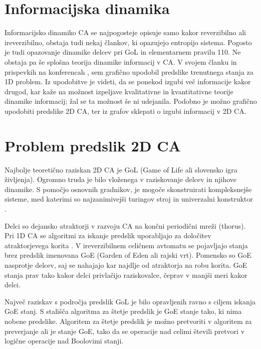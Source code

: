 \documentclass[12pt,a4paper,openany,twoside]{book}
\begin{document}
\section{Informacijska dinamika}

Informacijsko dinamiko CA se najpogosteje opisuje samo kakor reverzibilno ali ireverzibilno,
obstaja tudi nekaj člankov, ki opazujejo entropijo sistema.
Pogosto je tudi opazovanje dinamike delcev pri GoL in elementarnem pravilu 110.
Ne obstaja pa še splošna teorija dinamike informacij v CA.
V svojem članku \cite{JerasDobnikar2007} in prispevkih na konferencah \cite{DBLP:conf/iccS/JerasD06, DBLP:conf/automata/Jeras08},
sem grafično upodobil predslike trenutnega stanja za 1D problem.
Iz upodobitve je videti, da se ponekod izgubi več informacije kakor drugod,
kar kaže na možnost izpeljave kvalitativne in kvantitativne teorije dinamike informacij;
žal se ta možnost še ni udejanila. Podobno je možno grafično upodobiti predslike 2D CA,
ter iz grafov sklepati o izgubi informacij v 2D CA.

\section{Problem predslik 2D CA}

Najbolje teoretično raziskan 2D CA je GoL (Game of Life ali slovensko igra življenja).
Ogromno truda je bilo vloženega v raziskovanje delcev in njihove dinamike. S pomočjo
osnovnih gradnikov, je mogoče skonstruirati kompleksnejše sisteme, med katerimi so
najzanimivejši turingov stroj \cite{Rendell2001} in univerzalni konstruktor \cite{Greene2013}.

Delci so dejansko atraktorji v razvoju CA na končni periodični mreži (thorus).
Pri 1D CA se algoritmi za iskanje predslik uporabljajo za določitev atraktorjevega korita \cite{Wuensche1992}.
V ireverzibilnem celičnem avtomatu se pojavljajo stanja brez predslik imenovana GoE
(Garden of Eden ali rajski vrt). Pomensko so GoE nasprotje delcev, saj se nahajajo kar
najdlje od atraktorja na robu korita. GoE stanja prav tako kakor delci privlačijo raziskovalce,
čeprav v manjši meri kakor delci.

Največ raziskav s področja predslik GoL je bilo opravljenih ravno s ciljem iskanja GoE stanj.
S stališča algoritma za štetje predslik je GoE stanje tako, ki nima nobene predslike.
Algoritem za štetje predslik je možno pretvoriti v algoritem za preverjanje ali je stanje GoE,
tako da se operacije nad celimi števili pretvori v logične operacije nad Boolovimi stanji.
\end{document}
